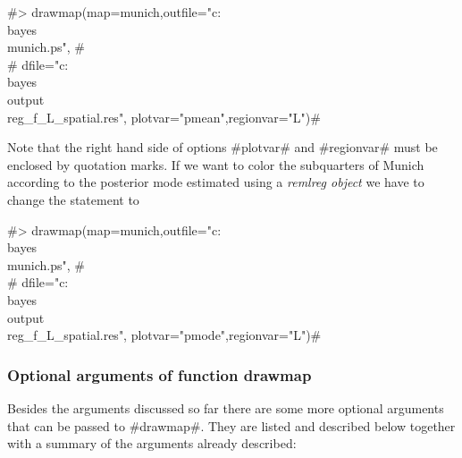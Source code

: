  #> drawmap(map=munich,outfile="c:\\bayes\\munich.ps", #\\
 #  dfile="c:\\bayes\\output\\reg_f_L_spatial.res", plotvar="pmean",regionvar="L")#

Note that the right hand side of options #plotvar# and #regionvar#
must be enclosed by quotation marks. If we want to color the
subquarters of Munich according to the posterior mode estimated
using a {\em remlreg object} we have to change the statement to

 #> drawmap(map=munich,outfile="c:\\bayes\\munich.ps", #\\
 #  dfile="c:\\bayes\\output\\reg_f_L_spatial.res", plotvar="pmode",regionvar="L")#

\subsubsection*{Optional arguments of function drawmap}

Besides the arguments discussed so far there are some more
optional arguments that can be passed to #drawmap#. They are
listed and described below together with a summary of the
arguments already described:


